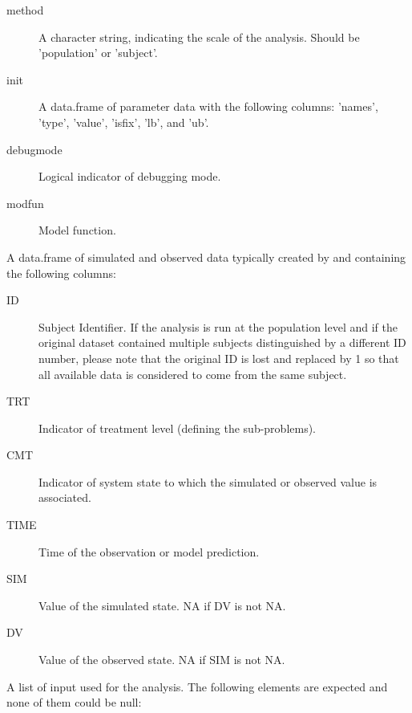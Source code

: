 \begin{Arguments}
\begin{ldescription}
\begin{description}
\item[method] A character string, indicating the scale of the analysis. Should
be 'population' or 'subject'.
\item[init] A data.frame of parameter data with the following columns:
'names', 'type', 'value', 'isfix', 'lb', and 'ub'.
\item[debugmode] Logical indicator of debugging mode.
\item[modfun] Model function.

\end{description}


\item[\code{simdf}] A data.frame of simulated and observed data typically created
by  and containing the following columns: \begin{description}

\item[ID] Subject Identifier. If the analysis is run at the population level
and if the original dataset contained multiple subjects distinguished by
a different ID number, please note that the original ID is lost and 
replaced by 1 so that all available data is considered to come from the 
same subject.
\item[TRT] Indicator of treatment level (defining the sub-problems).
\item[CMT] Indicator of system state to which the simulated or observed 
value is associated.
\item[TIME] Time of the observation or model prediction.
\item[SIM] Value of the simulated state. NA if DV is not NA.
\item[DV] Value of the observed state. NA if SIM is not NA.

\end{description}


\item[\code{files}] A list of input used for the analysis. The following elements are
expected and none of them could be null: \begin{description}


\end{description}
\end{ldescription}
\end{Arguments}
